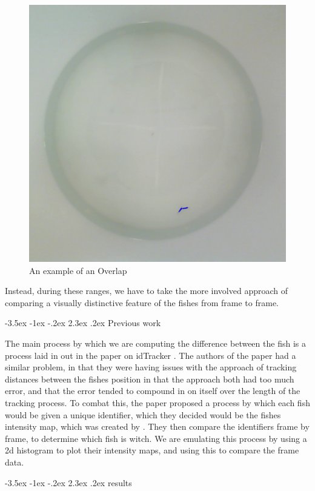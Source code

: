 \documentclass{article}
\makeatletter
\renewcommand\section{\clearpage\newpage\@startsection {section}{1}{\z@}%
	{-3.5ex \@plus -1ex \@minus -.2ex}%
	{2.3ex \@plus.2ex}%
	{\normalfont\Large\bfseries}}
\makeatother
\begin{document}
\begin{figure}[H]
	\centering
	\includegraphics[width=.75\linewidth]{overlap}
	\caption{An example of an Overlap}
	\label{fig:overlap}
\end{figure}

Instead, during these ranges, we have to take the more involved approach of comparing a visually distinctive feature of the fishes from frame to frame.

\section{Previous work}

The main process by which we are computing the difference between the fish is a process laid in out in the paper on idTracker \cite{idTracker}. The authors of the paper had a similar problem, in that they were having issues with the approach of tracking distances between the fishes position in that the approach both had too much error, and that the error tended to compound in on itself over the length of the tracking process. To combat this, the paper proposed a process by which each fish would be given a unique identifier, which they decided would be the fishes intensity map, which was created by . They then compare the identifiers frame by frame, to determine which fish is witch. We are emulating this process by using a 2d histogram to plot their intensity maps, and using this to compare the frame data.

\section{results}
\end{document}
